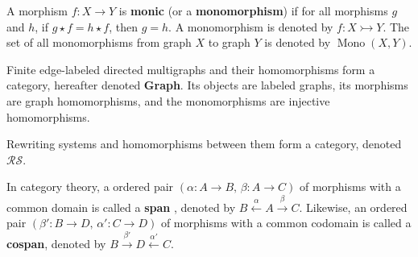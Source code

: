 \begin{definition}
    \label{def:cat:homo}
    A morphism \( f : X \mathop{\to} Y \) is \textbf{monic} (or a \textbf{monomorphism}) if for all morphisms \( g \) and \( h \), if \( g \mathop{\star} f \mathop{=} h \mathop{\star} f \), then \( g \mathop{=} h \). A monomorphism is denoted by \( f : X \rightarrowtail Y \). The set of all monomorphisms from graph \( X \) to graph \( Y \) is denoted by \( \operatorname{Mono}(X, Y) \).
\end{definition} 
\begin{example}
     Finite edge-labeled directed multigraphs and their homomorphisms form a category, hereafter denoted \textbf{Graph}. Its objects are labeled graphs, its morphisms are graph homomorphisms, and the monomorphisms are injective homomorphisms.
\end{example}
\begin{definition}
    Rewriting systems and homomorphisms between them form a category, denoted $\mathcal{RS}$.   
  \end{definition}
In category theory, a ordered pair \((\alpha : A \mathop{\to} B,\, \beta : A \mathop{\to} C)\) of morphisms with a common domain is called a \textbf{span} \cite{lowe2010graph}, denoted by
\(
B \overset{\alpha}{\leftarrow} A \overset{\beta}{\rightarrow} C.
\)
Likewise, an ordered pair \((\beta' : B \mathop{\to} D,\, \alpha' : C \mathop{\to} D)\) of morphisms with a common codomain is called a \textbf{cospan}, denoted by
\(
B \overset{\beta'}{\rightarrow} D \overset{\alpha'}{\leftarrow} C.
\)

